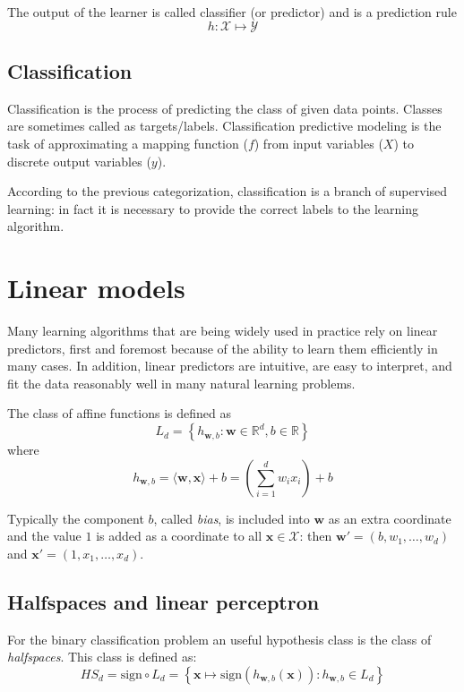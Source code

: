 \documentclass[a4paper, 11pt]{article}
\begin{document}
The output of the learner is called classifier (or predictor) and is a prediction rule $$h: \mathcal{X} \mapsto \mathcal{Y}$$

\subsection*{Classification}
Classification is the process of predicting the class of given data points. Classes are sometimes called as targets/labels. Classification predictive modeling is the task of approximating a mapping function ($f$) from input variables ($X$) to discrete output variables ($y$).

According to the previous categorization, classification is a branch of supervised learning: in fact it is necessary to provide the correct labels to the learning algorithm.

\section*{Linear models}
Many learning algorithms that are being widely used in practice rely on linear predictors, first and foremost because of the ability to learn them efficiently in many cases. In addition, linear predictors are intuitive, are easy to interpret, and fit the data reasonably well in many natural learning problems.

The class of affine functions is defined as
\begin{equation}
L_d = \left\{ h_{\mathbf{w},b}: \mathbf{w} \in \mathbb{R}^d, b \in \mathbb{R} \right\}
\end{equation}
where
\begin{equation}
h_{\mathbf{w},b} = \langle \mathbf{w}, \mathbf{x} \rangle + b = \left( \sum\limits_{i=1}^{d} w_i x_i \right) + b
\end{equation}

Typically the component $b$, called \textit{bias}, is included into $\mathbf{w}$ as an extra coordinate and the value $1$ is added as a coordinate to all $\mathbf{x} \in \mathcal{X}$: then $\mathbf{w'} = (b, w_1, \dots, w_d)$ and $\mathbf{x'} = (1, x_1, \dots, x_d)$.

\subsection*{Halfspaces and linear perceptron}
For the binary classification problem an useful hypothesis class is the class of \textit{halfspaces}. This class is defined as:
\begin{equation}
HS_d = \text{sign} \circ L_d = \left\{\mathbf{x} \mapsto \text{sign} \left( h_{\mathbf{w},b}(\mathbf{x}) \right) : h_{\mathbf{w},b} \in L_d \right\}
\end{equation}
\end{document}
